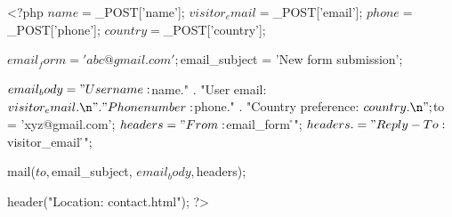 <?php
$name = $_POST['name'];
$visitor_email = $_POST['email'];
$phone = $_POST['phone'];
$country = $_POST['country'];

$email_form = 'abc@gmail.com';
$email_subject = 'New form submission';

$email_body = "User name: $name.\n" .
              "User email: $visitor_email.\n" .
              "Phone number: $phone.\n" .
              "Country preference: $country.\n";

$to = 'xyz@gmail.com';
$headers = "From: $email_form \r\n";
$headers .= "Reply-To: $visitor_email \r\n";

mail($to, $email_subject, $email_body, $headers);

header("Location: contact.html");
?>
